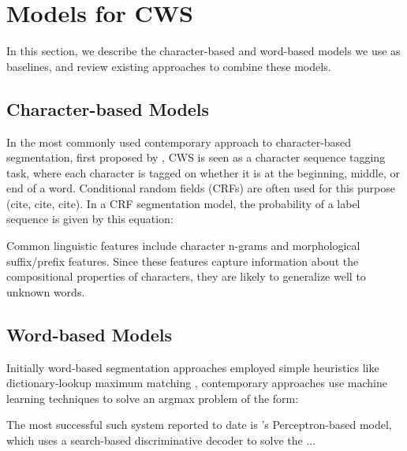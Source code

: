\section{Models for CWS}

In this section, we describe the character-based and word-based models we use as baselines, and review existing approaches to combine these models.

\subsection{Character-based Models}
In the most commonly used contemporary approach to character-based segmentation, first proposed by \cite{Xue:2003:IJCLCLP}, CWS is seen as a character sequence tagging task, where each character is tagged on whether it is at the beginning, middle, or end of a word. Conditional random fields (CRFs) are often used for this purpose (cite, cite, cite). In a CRF segmentation model, the probability of a label sequence is given by this equation:


Common linguistic features include character n-grams and morphological suffix/prefix features. Since these features capture information about the compositional properties of characters, they are likely to generalize well to unknown words.


\subsection{Word-based Models}

Initially word-based segmentation approaches employed simple heuristics like dictionary-lookup maximum matching \cite{Chen:1992:ACL}, contemporary approaches use machine learning techniques to solve an argmax problem of the form:


The most successful such system reported to date is \cite{Zhang:2007:ACL}'s Perceptron-based model, which uses a search-based discriminative decoder to solve the ... %


